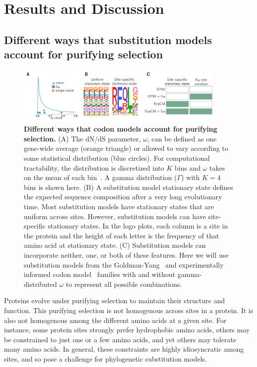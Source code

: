 \documentclass[11pt]{article}
\begin{document}
\section*{Results and Discussion}

\subsection*{Different ways that substitution models account for purifying selection}

\begin{figure}
\centerline{\includegraphics[width=0.90\textwidth]{figures/model_feature.pdf}}
\caption{\label{fig:model_feature}
\textbf{Different ways that codon models account for purifying selection.}
(A) The dN/dS parameter, $\omega$, can be defined as one gene-wide average (orange triangle) or allowed to vary according to some statistical distribution (blue circles). 
For computational tractability, the distribution is discretized into $K$ bins and $\omega$ takes on the mean of each bin~\citep{yang1994maximum,yang2000codon}. 
A gamma distribution ($\Gamma$) with $K=4$ bins is shown here.
(B) A substitution model stationary state defines the expected sequence composition after a very long evolutionary time. 
Most substitution models have stationary states that are uniform across sites.
However, substitution models can have site-specific stationary states.
In the logo plots, each column is a site in the protein and the height of each letter is the frequency of that amino acid at stationary state. 
(C) Substitution models can incorporate neither, one, or both of these features.
Here we will use substitution models from the Goldman-Yang~\citep[GY94;][]{goldman1994codon,yang2000codon} and experimentally informed codon model~\citep[ExpCM;][]{hilton2017phydms} families with and without gamma-distributed $\omega$ to represent all possible combinations.
}
\end{figure}

Proteins evolve under purifying selection to maintain their structure and function. 
This purifying selection is not homogenous across sites in a protein.
It is also not homogenous among the different amino acids at a given site.
For instance, some protein sites strongly prefer hydrophobic amino acids, others may be constrained to just one or a few amino acids, and yet others may tolerate many amino acids.
In general, these constraints are highly idiosyncratic among sites, and so pose a challenge for phylogenetic substitution models.
\end{document}

